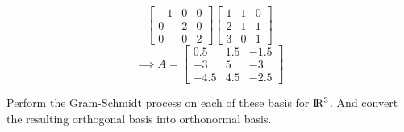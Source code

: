 \documentclass[solution,addpoints,12pt]{exam}
\newenvironment{Solution}{\begin{solution}}{\end{solution}}
\begin{document}
\begin{questions}
\begin{Solution}
\[\begin{bmatrix}
            -1 & 0 & 0 \\
            0 & 2 & 0 \\
            0 & 0 & 2
        \end{bmatrix}\begin{bmatrix}
            1 & 1 & 0 \\
            2 & 1 & 1 \\
            3 & 0 & 1
        \end{bmatrix}\]
        \[\implies A = \begin{bmatrix}
            0.5 & 1.5 & -1.5 \\
            -3 & 5 & -3 \\
            -4.5 & 4.5 & -2.5
        \end{bmatrix}\]
        \end{Solution}

\question Perform the Gram-Schmidt process on each of these basis for ${\rm I\!R^3}$. And convert the resulting orthogonal basis into orthonormal basis.

\end{questions}
\end{document}
